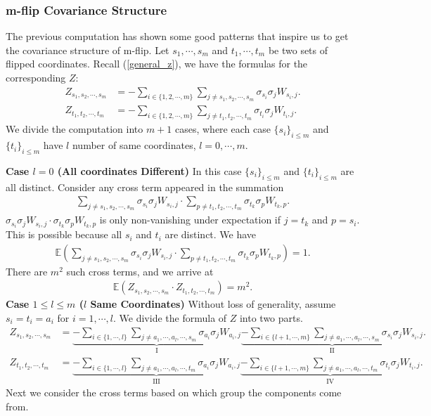 \documentclass[10pt]{article}
\newcommand{\e}{\mathbb{E}}
\newenvironment{Proof of lemma}{\noindent{\bf Proof of Lemma}}{\hfill$\Box$\newline}
\newenvironment{Proof of claim}{\noindent{\bf Proof of claim}}{\hfill$\Box$\newline}
\newenvironment{Proof of theorem}{\noindent{\bf Proof of Theorem}}{\hfill\scriptsize{$\Box$}\newline}
\newenvironment{Proof of theorems}{\noindent{\bf Proof of Theorems}}{\hfill$\Box$\newline}
\newenvironment{Proof of proposition}{\noindent{\bf Proof of Proposition}}{\hfill$\Box$\newline}
\newenvironment{Proof of propositions}{\noindent{\bf Proof of Propositions}}{\hfill$\Box$\newline}
\newenvironment{Proof of exercise}{\noindent{\it Proof of Exercise:}}{\hfill$\Box$}
\numberwithin{equation}{section}
\begin{document}
\subsubsection{m-flip Covariance Structure}
The previous computation has shown some good patterns that inspire us to get the covariance structure of m-flip. Let $s_1, \cdots, s_m$ and $t_1, \cdots, t_m$ be two sets of flipped coordinates. Recall (\ref{general_z}), we have the formulas for the corresponding $Z$:
\begin{align}
    Z_{s_1,s_2,\cdots,s_m} &= -\sum_{i \in \{1,2,\cdots,m\}} \sum_{j \neq s_1,s_2,\cdots,s_m} \sigma_{s_i} \sigma_j W_{s_i,j}. \\
    Z_{t_1,t_2,\cdots,t_m} &= -\sum_{i \in \{1,2,\cdots,m\}} \sum_{j \neq t_1,t_2,\cdots,t_m} \sigma_{t_i} \sigma_j W_{t_i,j}.
\end{align}
We divide the computation into $m+1$ cases, where each case $\{s_i\}_{i \leq m}$ and $\{t_i\}_{i \leq m}$ have $l$ number of same coordinates, $l = 0, \cdots, m$. 

\textbf{Case $l = 0$ (All coordinates Different)} In this case $\{s_i\}_{i \leq m}$ and $\{t_i\}_{i \leq m}$ are all distinct. Consider any cross term appeared in the summation
\begin{align}
    \sum_{j \neq s_1,s_2,\cdots,s_m} \sigma_{s_i} \sigma_j W_{s_i,j} \cdot \sum_{p \neq t_1,t_2,\cdots,t_m} \sigma_{t_k} \sigma_p W_{t_k,p}.
\end{align}
$\sigma_{s_i} \sigma_j W_{s_i,j} \cdot \sigma_{t_k} \sigma_p W_{t_k,p}$ is only non-vanishing under expectation if $j = t_k$ and $p = s_i$. This is possible because all $s_i$ and $t_i$ are distinct. We have
\begin{align}
    \e \left(\sum_{j \neq s_1,s_2,\cdots,s_m} \sigma_{s_i} \sigma_j W_{s_i,j} \cdot \sum_{p \neq t_1,t_2,\cdots,t_m} \sigma_{t_k} \sigma_p W_{t_k,p}\right) = 1.
\end{align}
There are $m^2$ such cross terms, and we arrive at
\begin{align}
    \e(Z_{s_1,s_2,\cdots,s_m} \cdot Z_{t_1,t_2,\cdots,t_m}) = m^2.
\end{align}
\textbf{Case $1\leq l \leq m$ ($l$ Same Coordinates)} Without loss of generality, assume $s_i=t_i=a_i$ for $i = 1, \cdots, l$. We divide the formula of $Z$ into two parts.
\begin{align}
        Z_{s_1,s_2,\cdots,s_m} &= \underbrace{-\sum_{i \in \{1,\cdots,l\}} \sum_{j \neq a_1,\cdots,a_l,\cdots,s_m} \sigma_{a_i} \sigma_j W_{a_i,j}}_\text{I} \underbrace{-\sum_{i \in \{l+1,\cdots,m\}} \sum_{j \neq a_1,\cdots,a_l,\cdots,s_m} \sigma_{s_i} \sigma_j W_{s_i,j}}_\text{II}. \\
        Z_{t_1,t_2,\cdots,t_m} &= \underbrace{-\sum_{i \in \{1,\cdots,l\}} \sum_{j \neq a_1,\cdots,a_l,\cdots,t_m} \sigma_{a_i} \sigma_j W_{a_i,j}}_\text{III} \underbrace{-\sum_{i \in \{l+1,\cdots,m\}} \sum_{j \neq a_1,\cdots,a_l,\cdots,t_m} \sigma_{t_i} \sigma_j W_{t_i,j}}_\text{IV}.
\end{align}
Next we consider the cross terms based on which group the components come from.
\end{document}
